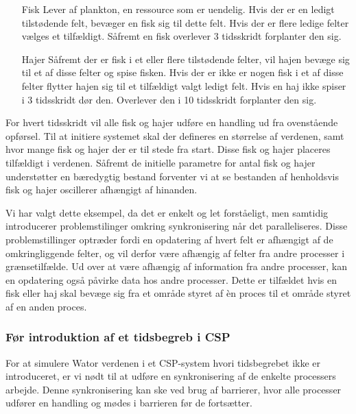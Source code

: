 \begin{itemize}
\item[Fisk]
Lever af plankton, en ressource som er uendelig. Hvis der er en ledigt 
tilstødende felt, bevæger en fisk sig til dette felt. Hvis der er flere ledige 
felter vælges et tilfældigt. Såfremt en fisk overlever 3 tidsskridt forplanter 
den sig.
\item[Hajer]
Såfremt der er fisk i et eller flere tilstødende felter, vil hajen bevæge sig 
til et af disse felter og spise fisken. Hvis der er ikke er nogen fisk i et af 
disse felter flytter hajen sig til et tilfældigt valgt ledigt felt. Hvis en haj 
ikke spiser i 3 tidsskridt dør den. Overlever den i 10 tidsskridt forplanter 
den sig.
\end{itemize}

For hvert tidsskridt vil alle fisk og hajer udføre en handling ud fra
ovenstående opførsel.
Til at initiere systemet skal der defineres en størrelse af verdenen,
samt hvor mange fisk og hajer der er til stede fra start. Disse fisk og
hajer placeres tilfældigt i verdenen.
Såfremt de initielle parametre for antal fisk og hajer understøtter en 
bæredygtig bestand forventer vi at se bestanden af henholdsvis fisk og hajer 
oscillerer afhængigt af hinanden.


Vi har valgt dette eksempel, da det er enkelt og let forståeligt, men samtidig 
introducerer problemstilinger omkring synkronisering når det paralleliseres.  
Disse problemstillinger optræder fordi en opdatering af hvert felt er afhængigt 
af de omkringliggende felter, og vil derfor være afhængig af felter fra andre 
processer i grænsetilfælde. Ud over at være afhængig af information fra andre 
processer, kan en opdatering også påvirke data hos andre processer. Dette er 
tilfældet hvis en fisk eller haj skal bevæge sig fra et område styret af èn 
proces til et område styret af en anden proces.  

\subsubsection*{Før introduktion af et tidsbegreb i CSP} 
For at simulere Wator verdenen i et CSP-system hvori tidsbegrebet ikke er 
introduceret, er vi nødt til at udføre en synkronisering af de enkelte 
processers arbejde. Denne synkronisering kan ske ved brug af barrierer, hvor 
alle processer udfører en handling og mødes i barrieren før de fortsætter.

